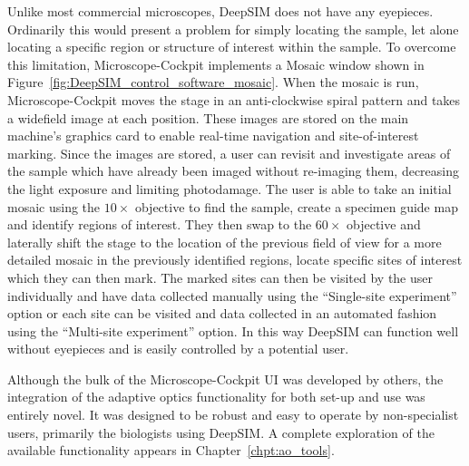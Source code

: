 Unlike most commercial microscopes, DeepSIM does not have any eyepieces. Ordinarily this would present a problem for simply locating the sample, let alone locating a specific region or structure of interest within the sample. To overcome this limitation, Microscope-Cockpit implements a Mosaic window shown in Figure~\ref{fig:DeepSIM_control_software_mosaic}. When the mosaic is run, Microscope-Cockpit moves the stage in an anti-clockwise spiral pattern and takes a widefield image at each position. These images are stored on the main machine's graphics card to enable real-time navigation and site-of-interest marking. Since the images are stored, a user can revisit and investigate areas of the sample which have already been imaged without re-imaging them, decreasing the light exposure and limiting photodamage. The user is able to take an initial mosaic using the $10\times$ objective to find the sample, create a specimen guide map and identify regions of interest. They then swap to the $60\times$ objective and laterally shift the stage to the location of the previous field of view for a more detailed mosaic in the previously identified regions, locate specific sites of interest which they can then mark. The marked sites can then be visited by the user individually and have data collected manually using the ``Single-site experiment'' option or each site can be visited and data collected in an automated fashion using the ``Multi-site experiment'' option. In this way DeepSIM can function well without eyepieces and is easily controlled by a potential user.

Although the bulk of the Microscope-Cockpit UI was developed by others, the integration of the adaptive optics functionality for both set-up and use was entirely novel. It was designed to be robust and easy to operate by non-specialist users, primarily the biologists using DeepSIM. A complete exploration of the available functionality appears in Chapter~\ref{chpt:ao_tools}.
